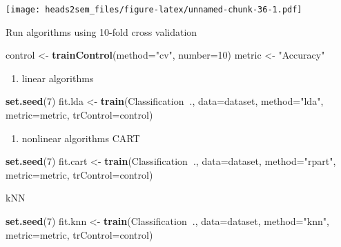 \documentclass[]{book}
\newenvironment{Shaded}{\begin{snugshade}}{\end{snugshade}}
\newcommand{\DataTypeTok}[1]{\textcolor[rgb]{0.13,0.29,0.53}{#1}}
\newcommand{\DecValTok}[1]{\textcolor[rgb]{0.00,0.00,0.81}{#1}}
\newcommand{\KeywordTok}[1]{\textcolor[rgb]{0.13,0.29,0.53}{\textbf{#1}}}
\newcommand{\NormalTok}[1]{#1}
\newcommand{\OperatorTok}[1]{\textcolor[rgb]{0.81,0.36,0.00}{\textbf{#1}}}
\newcommand{\StringTok}[1]{\textcolor[rgb]{0.31,0.60,0.02}{#1}}
\providecommand{\tightlist}{%
  \setlength{\itemsep}{0pt}\setlength{\parskip}{0pt}}
\begin{document}
\texttt{[image: heads2sem\_files/figure-latex/unnamed-chunk-36-1.pdf]}

Run algorithms using 10-fold cross validation

\begin{Shaded}
\begin{Highlighting}[]
\NormalTok{control <-}\StringTok{ }\KeywordTok{trainControl}\NormalTok{(}\DataTypeTok{method=}\StringTok{"cv"}\NormalTok{, }\DataTypeTok{number=}\DecValTok{10}\NormalTok{)}
\NormalTok{metric <-}\StringTok{ "Accuracy"}
\end{Highlighting}
\end{Shaded}

\begin{enumerate}
\def\labelenumi{\alph{enumi})}
\tightlist
\item
  linear algorithms
\end{enumerate}

\begin{Shaded}
\begin{Highlighting}[]
\KeywordTok{set.seed}\NormalTok{(}\DecValTok{7}\NormalTok{)}
\NormalTok{fit.lda <-}\StringTok{ }\KeywordTok{train}\NormalTok{(Classification}\OperatorTok{~}\NormalTok{., }\DataTypeTok{data=}\NormalTok{dataset, }\DataTypeTok{method=}\StringTok{"lda"}\NormalTok{, }\DataTypeTok{metric=}\NormalTok{metric, }\DataTypeTok{trControl=}\NormalTok{control)}
\end{Highlighting}
\end{Shaded}

\begin{enumerate}
\def\labelenumi{\alph{enumi})}
\setcounter{enumi}{1}
\tightlist
\item
  nonlinear algorithms
  CART
\end{enumerate}

\begin{Shaded}
\begin{Highlighting}[]
\KeywordTok{set.seed}\NormalTok{(}\DecValTok{7}\NormalTok{)}
\NormalTok{fit.cart <-}\StringTok{ }\KeywordTok{train}\NormalTok{(Classification}\OperatorTok{~}\NormalTok{., }\DataTypeTok{data=}\NormalTok{dataset, }\DataTypeTok{method=}\StringTok{"rpart"}\NormalTok{, }\DataTypeTok{metric=}\NormalTok{metric, }\DataTypeTok{trControl=}\NormalTok{control)}
\end{Highlighting}
\end{Shaded}

kNN

\begin{Shaded}
\begin{Highlighting}[]
\KeywordTok{set.seed}\NormalTok{(}\DecValTok{7}\NormalTok{)}
\NormalTok{fit.knn <-}\StringTok{ }\KeywordTok{train}\NormalTok{(Classification}\OperatorTok{~}\NormalTok{., }\DataTypeTok{data=}\NormalTok{dataset, }\DataTypeTok{method=}\StringTok{"knn"}\NormalTok{, }\DataTypeTok{metric=}\NormalTok{metric, }\DataTypeTok{trControl=}\NormalTok{control)}
\end{Highlighting}
\end{Shaded}
\end{document}
